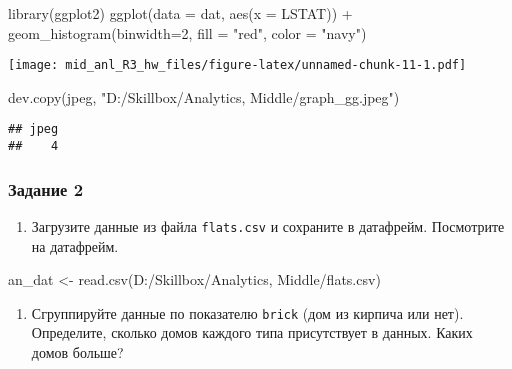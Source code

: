 \documentclass[
]{article}
\newenvironment{Shaded}{\begin{snugshade}}{\end{snugshade}}
\newcommand{\AttributeTok}[1]{\textcolor[rgb]{0.77,0.63,0.00}{#1}}
\newcommand{\DecValTok}[1]{\textcolor[rgb]{0.00,0.00,0.81}{#1}}
\newcommand{\FunctionTok}[1]{\textcolor[rgb]{0.00,0.00,0.00}{#1}}
\newcommand{\NormalTok}[1]{#1}
\newcommand{\OtherTok}[1]{\textcolor[rgb]{0.56,0.35,0.01}{#1}}
\newcommand{\SpecialCharTok}[1]{\textcolor[rgb]{0.00,0.00,0.00}{#1}}
\newcommand{\StringTok}[1]{\textcolor[rgb]{0.31,0.60,0.02}{#1}}
\providecommand{\tightlist}{%
  \setlength{\itemsep}{0pt}\setlength{\parskip}{0pt}}
\begin{document}
\begin{Shaded}
\begin{Highlighting}[]
\FunctionTok{library}\NormalTok{(ggplot2)}
\FunctionTok{ggplot}\NormalTok{(}\AttributeTok{data =}\NormalTok{ dat, }\FunctionTok{aes}\NormalTok{(}\AttributeTok{x =}\NormalTok{ LSTAT)) }\SpecialCharTok{+} 
  \FunctionTok{geom\_histogram}\NormalTok{(}\AttributeTok{binwidth=}\DecValTok{2}\NormalTok{, }\AttributeTok{fill =} \StringTok{"red"}\NormalTok{, }\AttributeTok{color =} \StringTok{"navy"}\NormalTok{)}
\end{Highlighting}
\end{Shaded}

\texttt{[image: mid\_anl\_R3\_hw\_files/figure-latex/unnamed-chunk-11-1.pdf]}

\begin{Shaded}
\begin{Highlighting}[]
\FunctionTok{dev.copy}\NormalTok{(jpeg, }\StringTok{"D:/Skillbox/Analytics, Middle/graph\_gg.jpeg"}\NormalTok{)}
\end{Highlighting}
\end{Shaded}

\begin{verbatim}
## jpeg 
##    4
\end{verbatim}

\hypertarget{ux437ux430ux434ux430ux43dux438ux435-2}{%
\subsubsection{Задание 2}\label{ux437ux430ux434ux430ux43dux438ux435-2}}

\begin{enumerate}
\def\labelenumi{\arabic{enumi}.}
\tightlist
\item
  Загрузите данные из файла \texttt{flats.csv} и сохраните в датафрейм.
  Посмотрите на датафрейм.
\end{enumerate}

\begin{Shaded}
\begin{Highlighting}[]
\NormalTok{an\_dat }\OtherTok{\textless{}{-}} \FunctionTok{read.csv}\NormalTok{(}\StringTok{\textquotesingle{}D:/Skillbox/Analytics, Middle/flats.csv\textquotesingle{}}\NormalTok{)}
\end{Highlighting}
\end{Shaded}

\begin{enumerate}
\def\labelenumi{\arabic{enumi}.}
\setcounter{enumi}{1}
\tightlist
\item
  Сгруппируйте данные по показателю \texttt{brick} (дом из кирпича или
  нет). Определите, сколько домов каждого типа присутствует в данных.
  Каких домов больше?
\end{enumerate}
\end{document}

